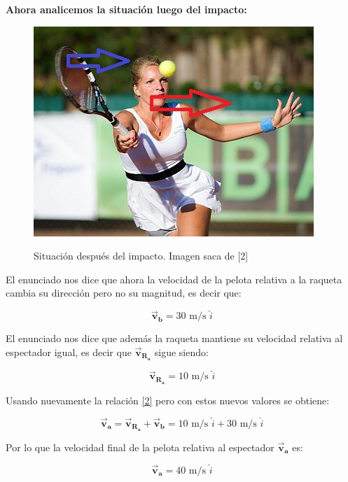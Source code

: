 \documentclass[a4paper,11pt]{article}
\theoremstyle{mytheor}
\begin{document}
\huge \textbf{Ahora analicemos la situación luego del impacto:} \normalsize


\begin{figure}[h]
	\includegraphics[width=1.0\linewidth]{ten2}
	\label{fcN4}
	\caption{Situación después del impacto. Imagen saca de [2]}
\end{figure}

El enunciado nos dice que ahora la velocidad de la pelota relativa a la raqueta cambia su dirección pero no su magnitud, es decir que:

 $$\vec{\textbf{v}}_{\textbf{b}} = 30  \text{ m/s } \hat{i} $$

El enunciado nos dice que además la raqueta mantiene su velocidad relativa al espectador igual, es decir que $\vec{\textbf{v}}_{\textbf{R}_\textbf{a}}$ sigue siendo:

$$ \vec{\textbf{v}}_{\textbf{R}_\textbf{a}} = 10 \text{ m/s } \hat{i} $$

Usando nuevamente la relación \ref{2} pero con estos nuevos valores se obtiene:



\begin{equation}
\vec{\textbf{v}}_{\textbf{a}} = \vec{\textbf{v}}_{\textbf{R}_\textbf{a}} + \vec{\textbf{v}}_{\textbf{b}} = 10 \text{ m/s } \hat{i} + 30 \text{ m/s } \hat{i}
\end{equation}

Por lo que la velocidad final de la pelota relativa al espectador $\vec{\textbf{v}}_{\textbf{a}}$ es:

\begin{equation}
 \vec{\textbf{v}}_{\textbf{a}} =  40 \text{ m/s } \hat{i} 
\end{equation}
\end{document}
